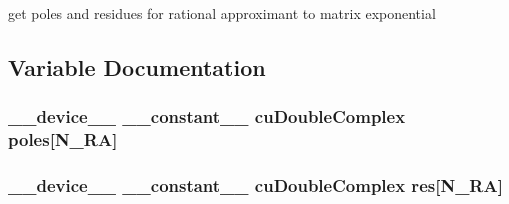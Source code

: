 get poles and residues for rational approximant to matrix exponential 



\subsection{Variable Documentation}
\subsubsection[{\texorpdfstring{poles}{poles}}]{\setlength{\rightskip}{0pt plus 5cm}\+\_\+\+\_\+device\+\_\+\+\_\+ \+\_\+\+\_\+constant\+\_\+\+\_\+ cu\+Double\+Complex poles\mbox{[}{\bf N\+\_\+\+RA}\mbox{]}}\hypertarget{rational__approximant_8cu_a4a123ce887b4a39c29859b77db90e7e2}{}\label{rational__approximant_8cu_a4a123ce887b4a39c29859b77db90e7e2}
\subsubsection[{\texorpdfstring{res}{res}}]{\setlength{\rightskip}{0pt plus 5cm}\+\_\+\+\_\+device\+\_\+\+\_\+ \+\_\+\+\_\+constant\+\_\+\+\_\+ cu\+Double\+Complex res\mbox{[}{\bf N\+\_\+\+RA}\mbox{]}}\hypertarget{rational__approximant_8cu_af309432c3d053cc809c36518fb7d7f00}{}\label{rational__approximant_8cu_af309432c3d053cc809c36518fb7d7f00}
